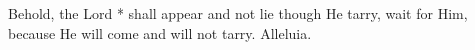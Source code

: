 Behold, the Lord * shall appear and not lie though He tarry, wait for Him, because He will come and will not tarry. Alleluia.
